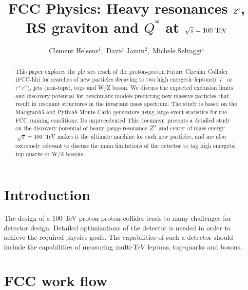 \documentclass{cernrep}
\begin{document}
\title{FCC Physics: Heavy resonances $Z^{\prime}$, RS graviton and $Q^{*}$ at $\sqrt{s} = 100 \TeV$}
\author{Clement Helsens${}^1$,\,
David Jamin${}^2$,\,
Michele Selvaggi${}^1$}


\begin{abstract}
This paper explores the physics reach of the proton-proton Future Circular Collider (FCC-hh)
for searches of new particles decaying to two high energetic leptons($l^{+}l^{-}$ or $\tau^{+}\tau^{-}$), jets (non-tops), tops and W/Z boson. We discuss the expected exclusion limits and discovery potential for benchmark models 
predicting new massive particles that result in resonant structures in
the invariant mass spectrum. The study is based on the Madgraph5 and Pythia8 Monte Carlo generators using large event statistics for the FCC running conditions. 
Its unprecedented  
This document presents a detailed study on the discovery potential of heavy gauge resonance $Z^{\prime}$ and center of mass energy $\sqrt[]{s} =100$~TeV makes it the ultimate machine for such new particles, and are also extremely relevant to discuss the main limitations of the detector to tag high energetic top-quarks or W/Z bosons.
\end{abstract}
\maketitle
\tableofcontents

\section{Introduction}
The design of a 100 TeV proton-proton collider leads to many challenges for detector design. Detailed optimizations of the detector is needed in order to achieve the required physics goals. The capabilities of such a detector should include the capabilities of measuring multi-TeV leptons, top-quarks and bosons.

\section{FCC work flow}
\label{sec:fccworkflow}
\end{document}
